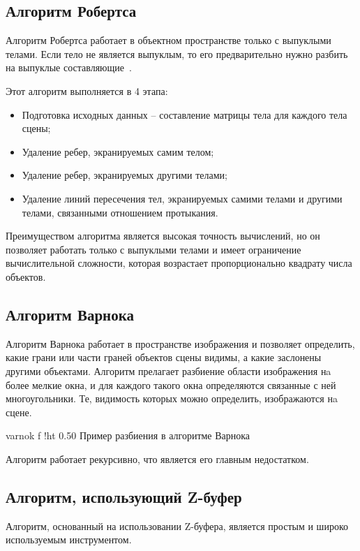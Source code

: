 \subsection{Алгоритм Робертса}

Алгоритм Робертса работает в объектном пространстве только с выпуклыми телами. 
Если тело не является выпуклым, то его предварительно нужно разбить на выпуклые составляющие~\cite{ROB}.

Этот алгоритм выполняется в 4 этапа:
\begin{itemize}[label*=---]
    \item Подготовка исходных данных – составление матрицы тела для каждого тела сцены;
    \item Удаление ребер, экранируемых самим телом;
    \item Удаление ребер, экранируемых другими телами; 
    \item Удаление линий пересечения тел, экранируемых самими телами и другими телами, связанными отношением протыкания.
\end{itemize}

Преимуществом алгоритма является высокая точность вычислений, но он позволяет работать только с выпуклыми телами и имеет ограничение вычислительной сложности, которая возрастает пропорционально квадрату числа объектов.

\subsection{Алгоритм Варнока}

Алгоритм Варнока работает в пространстве изображения и позволяет определить, какие грани или части граней объектов сцены видимы, а какие заслонены другими объектами. 
Алгоритм прелагает разбиение области изображения нa более мелкие окна, и для каждого такого окна определяются связанные с ней многоугольники.
Те, видимость которых можно определить, изображаются нa сцене.

    {varnok}
    {f}
    {!ht}
    {0.50\textwidth}
    {Пример разбиения в алгоритме Варнока}


Алгоритм работает рекурсивно, что является его главным недостатком.


\subsection{Алгоритм, использующий Z-буфер}

Алгоритм, основанный на использовании Z-буфера, является простым и широко используемым инструментом. 

